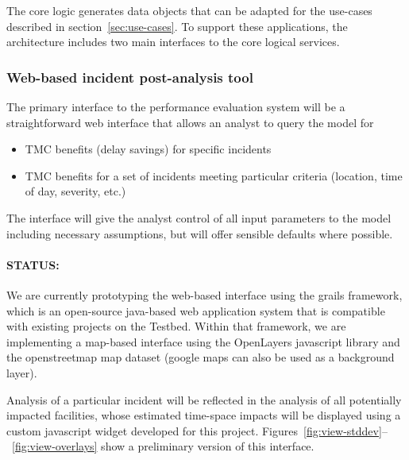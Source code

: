 \documentclass[12pt]{report}
\begin{document}
The core logic generates data objects that can be adapted for the
use-cases described in section~\ref{sec:use-cases}.  To support these
applications, the architecture includes two main interfaces to the
core logical services.

\subsubsection{Web-based incident post-analysis tool}

The primary interface to the performance evaluation system will be a
straightforward web interface that allows an analyst to query the
model for
\begin{itemize}
\item TMC benefits (delay savings) for specific incidents
\item TMC benefits for a set of incidents meeting particular criteria
  (location, time of day, severity, etc.)
\end{itemize}
The interface will give the analyst control of all input parameters to
the model including necessary assumptions, but will offer sensible
defaults where possible.

\paragraph{STATUS:} We are currently prototyping the web-based
interface using the grails framework, which is an open-source
java-based web application system that is compatible with existing
projects on the Testbed.  Within that framework, we are implementing a
map-based interface using the OpenLayers javascript library and the
openstreetmap map dataset (google maps can also be used as a
background layer).  

Analysis of a particular incident will be reflected in the analysis of
all potentially impacted facilities, whose estimated time-space
impacts will be displayed using a custom javascript widget developed
for this project.
Figures~\ref{fig:view-stddev}--~\ref{fig:view-overlays} show a
preliminary version of this interface.
\end{document}
